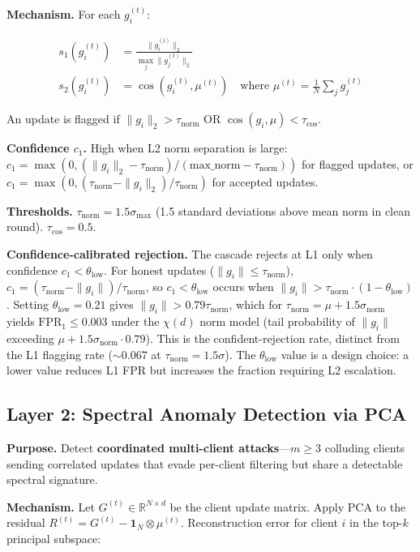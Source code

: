 \documentclass[10pt,journal]{IEEEtran}
\begin{document}
\textbf{Mechanism.} For each $g_i^{(t)}$:

\begin{align}
s_1(g_i^{(t)}) &= \frac{\|g_i^{(t)}\|_2}{\max_j \|g_j^{(t)}\|_2} \label{eq:norm}\\
s_2(g_i^{(t)}) &= \cos(g_i^{(t)}, \mu^{(t)}) \quad \text{where } \mu^{(t)} = \textstyle\frac{1}{N}\sum_j g_j^{(t)} \label{eq:cos}
\end{align}

An update is flagged if $\|g_i\|_2 > \tau_{\text{norm}}$ OR $\cos(g_i, \mu) < \tau_{\text{cos}}$.

\textbf{Confidence $c_1$.} High when L2 norm separation is large: $c_1 = \max(0, (\|g_i\|_2 - \tau_{\text{norm}})/(\text{max\_norm} - \tau_{\text{norm}}))$ for flagged updates, or $c_1 = \max(0, (\tau_{\text{norm}} - \|g_i\|_2)/\tau_{\text{norm}})$ for accepted updates.

\textbf{Thresholds.} $\tau_{\text{norm}} = 1.5\sigma_{\text{max}}$ (1.5 standard deviations above mean norm in clean round). $\tau_{\text{cos}} = 0.5$.

\textbf{Confidence-calibrated rejection.} The cascade rejects at L1 only when confidence $c_1 < \theta_{\text{low}}$. For honest updates ($\|g_i\| \le \tau_{\text{norm}}$), $c_1 = (\tau_{\text{norm}} - \|g_i\|) / \tau_{\text{norm}}$, so $c_1 < \theta_{\text{low}}$ occurs when $\|g_i\| > \tau_{\text{norm}} \cdot (1 - \theta_{\text{low}})$. Setting $\theta_{\text{low}} = 0.21$ gives $\|g_i\| > 0.79\tau_{\text{norm}}$, which for $\tau_{\text{norm}} = \mu + 1.5\sigma_{\text{norm}}$ yields $\text{FPR}_1 \le 0.003$ under the $\chi(d)$ norm model (tail probability of $\|g_i\|$ exceeding $\mu + 1.5\sigma_{\text{norm}} \cdot 0.79$). This is the confident-rejection rate, distinct from the L1 flagging rate ($\sim$0.067 at $\tau_{\text{norm}} = 1.5\sigma$). The $\theta_{\text{low}}$ value is a design choice: a lower value reduces L1 FPR but increases the fraction requiring L2 escalation.

\subsection{Layer 2: Spectral Anomaly Detection via PCA}
\label{sec:l2}

\textbf{Purpose.} Detect \textbf{coordinated multi-client attacks}---$m \ge 3$ colluding clients sending correlated updates that evade per-client filtering but share a detectable spectral signature.

\textbf{Mechanism.} Let $G^{(t)} \in \mathbb{R}^{N \times d}$ be the client update matrix. Apply PCA to the residual $R^{(t)} = G^{(t)} - \mathbf{1}_N \otimes \mu^{(t)}$. Reconstruction error for client $i$ in the top-$k$ principal subspace:
\end{document}
